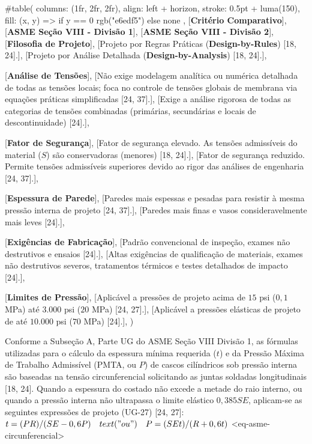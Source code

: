 #table(
  columns: (1fr, 2fr, 2fr),
  align: left + horizon,
  stroke: 0.5pt + luma(150),
  fill: (x, y) => if y == 0 { rgb("e6edf5") } else { none },
  [\textbf{Critério Comparativo}], [\textbf{ASME Seção VIII - Divisão 1}], [\textbf{ASME Seção VIII - Divisão 2}],
  [\textbf{Filosofia de Projeto}],
  [Projeto por Regras Práticas (\textbf{Design-by-Rules}) [18, 24].],
  [Projeto por Análise Detalhada (\textbf{Design-by-Analysis}) [18, 24].],

  [\textbf{Análise de Tensões}],
  [Não exige modelagem analítica ou numérica detalhada de todas as tensões locais; foca no controle de tensões globais de membrana via equações práticas simplificadas [24, 37].],
  [Exige a análise rigorosa de todas as categorias de tensões combinadas (primárias, secundárias e locais de descontinuidade) [24].],

  [\textbf{Fator de Segurança}],
  [Fator de segurança elevado. As tensões admissíveis do material ($S$) são conservadoras (menores) [18, 24].],
  [Fator de segurança reduzido. Permite tensões admissíveis superiores devido ao rigor das análises de engenharia [24, 37].],

  [\textbf{Espessura de Parede}],
  [Paredes mais espessas e pesadas para resistir à mesma pressão interna de projeto [24, 37].],
  [Paredes mais finas e vasos consideravelmente mais leves [24].],

  [\textbf{Exigências de Fabricação}],
  [Padrão convencional de inspeção, exames não destrutivos e ensaios [24].],
  [Altas exigências de qualificação de materiais, exames não destrutivos severos, tratamentos térmicos e testes detalhados de impacto [24].],

  [\textbf{Limites de Pressão}],
  [Aplicável a pressões de projeto acima de $15$ psi ($0,1$ MPa) até $3.000$ psi ($20$ MPa) [24, 27].],
  [Aplicável a pressões elásticas de projeto de até $10.000$ psi ($70$ MPa) [24].],
) 

Conforme a Subseção A, Parte UG do ASME Seção VIII Divisão 1, as fórmulas utilizadas para o cálculo da espessura mínima requerida ($t$) e da Pressão Máxima de Trabalho Admissível (PMTA, ou $P$) de cascos cilíndricos sob pressão interna são baseadas na tensão circunferencial solicitando as juntas soldadas longitudinais [18, 24]. Quando a espessura do costado não excede a metade do raio interno, ou quando a pressão interna não ultrapassa o limite elástico $0,385 S E$, aplicam-se as seguintes expressões de projeto (UG-27) [24, 27]:
$ t = (P R) / (S E - 0,6 P) \quad text("ou") \quad P = (S E t) / (R + 0,6 t) $ <eq-asme-circunferencial>

